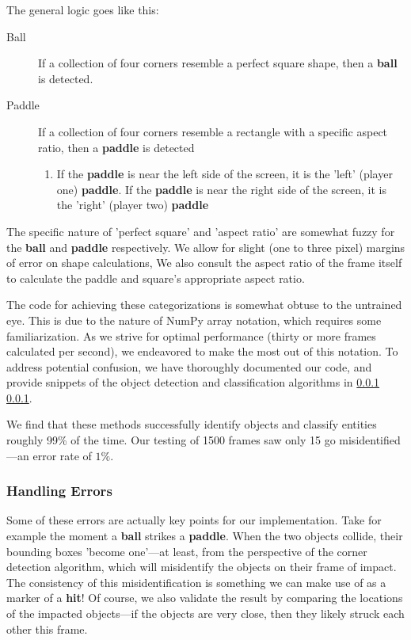 \documentclass{report}
\newcommand{\state}[1]{\textbf{#1}}
\newcommand{\pad}{\textbf{paddle}\xspace}
\newcommand{\ball}{\textbf{ball}\xspace}
\begin{document}
The general logic goes like this:

\begin{description}
    \item[Ball] If a collection of four corners resemble a perfect square shape, then a \ball is detected.  
    \item[Paddle] If a collection of four corners resemble a rectangle with a specific aspect ratio, then a \pad is detected
        \begin{enumerate}
            \item If the \pad is near the left side of the screen, it is the 'left' (player one) \pad. If the \pad is near the right side of the screen, it is the 'right' (player two) \pad
        \end{enumerate}
\end{description}

The specific nature of 'perfect square' and 'aspect ratio' are somewhat fuzzy for the \ball and \pad respectively. We allow for slight (one to three pixel) margins of error on shape calculations, We also consult the aspect ratio of the frame itself to calculate the paddle and square's appropriate aspect ratio. 


The code for achieving these categorizations is somewhat obtuse to the untrained eye. This is due to the nature of NumPy array notation, which requires some familiarization. As we strive for optimal performance (thirty or more frames calculated per second), we endeavored to make the most out of this notation. To address potential confusion, we have thoroughly documented our code, and provide snippets of the object detection and classification algorithms in \ref{} \ref{}.

We find that these methods successfully identify objects and classify entities roughly 99\% of the time. Our testing of 1500 frames saw only 15 go misidentified---an error rate of $1\%$. 

\subsubsection{Handling Errors}

Some of these errors are actually key points for our implementation. Take for example the moment a \ball strikes a \pad. When the two objects collide, their bounding boxes 'become one'---at least, from the perspective of the corner detection algorithm, which will misidentify the objects on their frame of impact. The consistency of this misidentification is something we can make use of as a marker of a \state{hit}!  Of course, we also validate the result by comparing the locations of the impacted objects---if the objects are very close, then they likely struck each other this frame.
\end{document}
